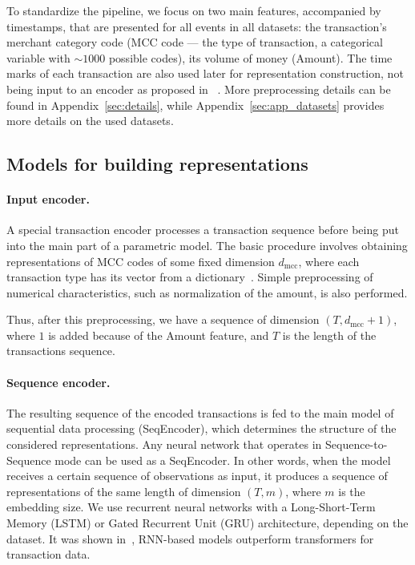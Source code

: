 To standardize the pipeline, we focus on two main features, accompanied by timestamps, that are presented for all events in all datasets: the transaction's merchant category code (MCC code --- the type of transaction, a categorical variable with $\sim 1000$ possible codes), its volume of money (Amount). 
The time marks of each transaction are also used later for representation construction, not being input to an encoder as proposed in ~\cite{babaev2022coles}. 
More preprocessing details can be found in Appendix~\ref{sec:details}, while Appendix~\ref{sec:app_datasets} provides more details on the used datasets.

\subsection{Models for building representations}

\paragraph{Input encoder.} A special transaction encoder processes a transaction sequence before being put into the main part of a parametric model.
The basic procedure involves obtaining representations of MCC codes of some fixed dimension $d_{\mathrm{mcc}}$, where each transaction type has its vector from a dictionary~\cite{pennington2014glove}. 
Simple preprocessing of numerical characteristics, such as normalization of the amount, is also performed.

Thus, after this preprocessing, we have a sequence of dimension $(T, d_{\mathrm{mcc}} + 1)$, where $1$ is added because of the Amount feature, and $T$ is the length of the transactions sequence.

\paragraph{Sequence encoder.} The resulting sequence of the encoded transactions is fed to the main model of sequential data processing (SeqEncoder), which determines the structure of the considered representations. Any neural network that operates in Sequence-to-Sequence mode can be used as a SeqEncoder. In other words, when the model receives a certain sequence of observations as input, it produces a sequence of representations of the same length of dimension $(T, m)$, where $m$ is the embedding size.
We use recurrent neural networks with a Long-Short-Term Memory (LSTM) or Gated Recurrent Unit (GRU) architecture, depending on the dataset. It was shown in~\cite{babaev2022coles}, RNN-based models outperform transformers for transaction data. 

